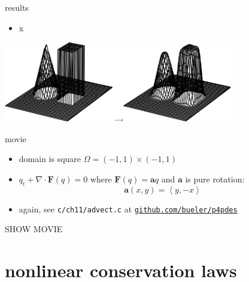 \documentclass[10pt,hyperref]{beamer}
\newcommand{\ba}{\mathbf{a}}
\newcommand{\bF}{\mathbf{F}}
\newcommand{\Div}{\nabla\cdot}
\begin{document}
\begin{frame}{results}

\begin{itemize}
\item x
\end{itemize}

\hfill \includegraphics[width=0.75\textwidth]{figs/bueler11p7}
\end{frame}


\begin{frame}{movie}

\begin{itemize}
\item domain is square $\Omega = (-1,1) \times (-1,1)$
\item $q_t + \Div \bF(q) = 0$ where $\bF(q) = \ba q$ and $\ba$ is pure rotation:
    $$\ba(x,y) = \left<y,-x\right>$$
\item again, see \texttt{c/ch11/advect.c} at \href{https://github.com/bueler/p4pdes}{\texttt{github.com/bueler/p4pdes}}
\end{itemize}

\vspace{10mm}
\begin{center}
\alert{SHOW MOVIE}
\end{center}

\end{frame}


\section{nonlinear conservation laws}
\end{document}
